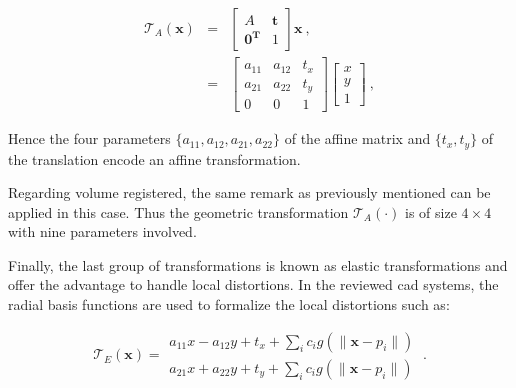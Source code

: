 \begin{eqnarray}
	\mathcal{T}_A(\mathbf{x}) & = & \begin{bmatrix}
		A & \mathbf{t} \\
		\mathbf{0^T} & 1
	\end{bmatrix} \mathbf{x} \ , \nonumber \\
	& = & \begin{bmatrix}
		a_{11} & a_{12} & t_x \\
		a_{21} & a_{22} & t_y \\
		0 & 0 & 1
	\end{bmatrix}\begin{bmatrix}
		x \\
		y \\
		1
	\end{bmatrix} \ , \label{eq:afftra}%
\end{eqnarray}

%
%

Hence the four parameters $\{a_{11},a_{12},a_{21},a_{22}\}$ of the affine matrix and $\{ t_x, t_y \}$ of the translation encode an affine transformation.

Regarding volume registered, the same remark as previously mentioned can be applied in this case. Thus the geometric transformation $\mathcal{T}_A(\cdot)$ is of size $4 \times 4$ with nine parameters involved.

Finally, the last group of transformations is known as elastic transformations and offer the advantage to handle local distortions. In the reviewed \ac{cad} systems, the radial basis functions are used to formalize the local distortions such as:

\begin{equation}
	\mathcal{T}_E(\mathbf{x}) = \begin{matrix}
	a_{11} x - a_{12} y + t_x + \sum_i c_i g(\| \mathbf{x} - p_i \|) \\
	a_{21} x + a_{22} y + t_y + \sum_i c_i g(\| \mathbf{x} - p_i \|)
	\end{matrix} \ .
\end{equation}


